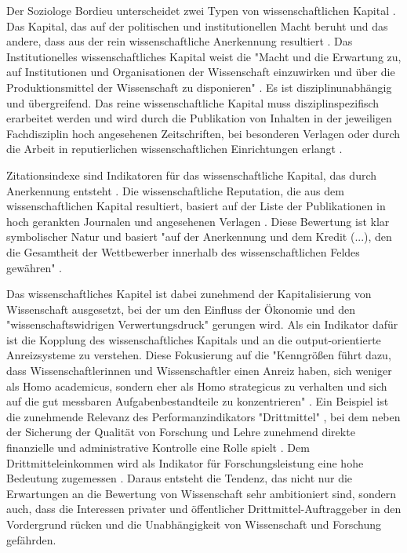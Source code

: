 Der Soziologe Bordieu unterscheidet zwei Typen von wissenschaftlichen Kapital \cite{Bourdieu_1998}. Das Kapital, das auf der politischen und institutionellen Macht beruht und das andere, dass aus der rein wissenschaftliche Anerkennung resultiert \cite{mikl_2010_soziologie}. Das Institutionelles wissenschaftliches Kapital weist die "Macht und die Erwartung zu, auf Institutionen und Organisationen der Wissenschaft einzuwirken und über die Produktionsmittel der Wissenschaft zu disponieren" \cite[:257]{Barl_sius_2008}. Es ist disziplinunabhängig und übergreifend. Das reine wissenschaftliche Kapital muss disziplinspezifisch erarbeitet werden und wird durch die Publikation von Inhalten in der jeweiligen Fachdisziplin hoch angesehenen Zeitschriften, bei besonderen Verlagen oder durch die Arbeit in reputierlichen wissenschaftlichen Einrichtungen erlangt \cite[:257]{Barl_sius_2008}.

Zitationsindexe sind Indikatoren für das wissenschaftliche Kapital, das durch Anerkennung entsteht \cite{Bourdieu_1998}. Die wissenschaftliche Reputation, die aus dem wissenschaftlichen Kapital resultiert, basiert auf der Liste der Publikationen in hoch gerankten Journalen und angesehenen Verlagen \cite{herb_2010}. Diese Bewertung ist klar symbolischer Natur und basiert "auf der Anerkennung und dem Kredit (...), den die Gesamtheit der Wettbewerber innerhalb des wissenschaftlichen Feldes gewähren" \cite{Bourdieu_1998} \cite{Barl_sius_2008} \cite{herb_2010}.

Das wissenschaftliches Kapitel ist dabei zunehmend der Kapitalisierung von Wissenschaft ausgesetzt, bei der um den Einfluss der Ökonomie und den "wissenschaftswidrigen Verwertungsdruck"  \cite[:12]{Neidhardt_2006} gerungen wird. Als ein Indikator dafür ist die Kopplung des wissenschaftliches Kapitals und an die output-orientierte Anreizsysteme zu verstehen. Diese Fokusierung auf die "Kenngrößen führt dazu, dass Wissenschaftlerinnen und Wissenschaftler einen Anreiz haben, sich weniger als Homo academicus, sondern eher als Homo strategicus zu verhalten und sich auf die gut messbaren Aufgabenbestandteile zu konzentrieren" \cite{Frost_2014}. Ein Beispiel ist die zunehmende Relevanz des Performanzindikators "Drittmittel" \cite{Fabrizio_2008} \cite{Jansen_2007}, bei dem neben der Sicherung der Qualität von Forschung und Lehre zunehmend direkte finanzielle und administrative Kontrolle eine Rolle spielt \cite{Barl_sius_2008}. Dem Drittmitteleinkommen wird als Indikator für Forschungsleistung eine hohe Bedeutung zugemessen \cite{Jansen_2007}. Daraus entsteht die Tendenz, das nicht nur die Erwartungen an die Bewertung von Wissenschaft sehr ambitioniert sind, sondern auch, dass die Interessen privater und öffentlicher Drittmittel-Auftraggeber in den Vordergrund rücken und die Unabhängigkeit von Wissenschaft und Forschung gefährden.

